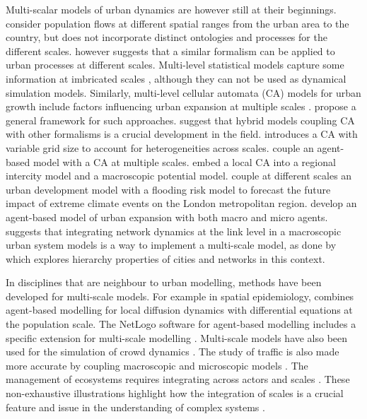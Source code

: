 \documentclass[referee,lineno,pdflatex,sn-apa]{sn-jnl}
\begin{document}
Multi-scalar models of urban dynamics are however still at their beginnings. \cite{murcio2015urban} consider population flows at different spatial ranges from the urban area to the country, but does not incorporate distinct ontologies and processes for the different scales. \cite{batty2005agents} however suggests that a similar formalism can be applied to urban processes at different scales. Multi-level statistical models capture some information at imbricated scales \citep{shu2020modelling}, although they can not be used as dynamical simulation models. Similarly, multi-level cellular automata (CA) models for urban growth include factors influencing urban expansion at multiple scales \citep{xu2019directional}. \cite{cheng2003modelling} propose a general framework for such approaches. \cite{torrens2001cellular} suggest that hybrid models coupling CA with other formalisms is a crucial development in the field. \cite{white2006modeling} introduces a CA with variable grid size to account for heterogeneities across scales. \cite{zhu2020dynamic} couple an agent-based model with a CA at multiple scales. \cite{yu2018modeling} embed a local CA into a regional intercity model and a macroscopic potential model. \cite{ford2019multi} couple at different scales an urban development model with a flooding risk model to forecast the future impact of extreme climate events on the London metropolitan region. \cite{xu2020urban} develop an agent-based model of urban expansion with both macro and micro agents. \cite{raimbault:halshs-02013006} suggests that integrating network dynamics at the link level in a macroscopic urban system models is a way to implement a multi-scale model, as done by \cite{raimbault2020hierarchy} which explores hierarchy properties of cities and networks in this context.

In disciplines that are neighbour to urban modelling, methods have been developed for multi-scale models. For example in spatial epidemiology, \cite{banos2015importance} combines agent-based modelling for local diffusion dynamics with differential equations at the population scale. The NetLogo software for agent-based modelling includes a specific extension for multi-scale modelling \cite{hjorth2020levelspace}. Multi-scale models have also been used for the simulation of crowd dynamics \cite{crociani2016multi}. The study of traffic is also made more accurate by coupling macroscopic and microscopic models \cite{boulet2020coupling}. The management of ecosystems  requires integrating across actors and scales \citep{belem2013organizational}. These non-exhaustive illustrations highlight how the integration of scales is a crucial feature and issue in the understanding of complex systems \citep{chavalarias2009french}.
\end{document}
